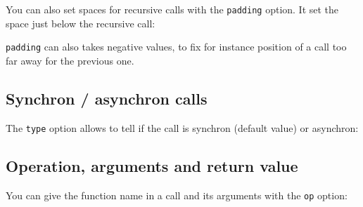 \documentclass[a4paper,11pt]{report}
\begin{document}
You can also set spaces for recursive calls with the {\tt padding} option. It set the space just below the recursive call:

\medskip

\begin{minipage}{0.5\textwidth}

\end{minipage}
\begin{minipage}{0.5\textwidth}
\begin{center}
\end{center}
\end{minipage}

\begin{remark}
{\tt padding} can also takes negative values, to fix for instance position of a call too far away for the previous one.
\end{remark}

\subsection{Synchron / asynchron calls}\label{ss.callsync}

The {\tt type} option allows to tell if the call is synchron (default value) or asynchron:

\medskip

\begin{minipage}{0.5\textwidth}

\end{minipage}
\begin{minipage}{0.5\textwidth}
\begin{center}
\end{center}
\end{minipage}

\subsection{Operation, arguments and return value}\label{ss.callop}

You can give the function name in a call and its arguments with the {\tt op} option:

\medskip

\begin{minipage}{0.5\textwidth}

\end{minipage}
\begin{minipage}{0.5\textwidth}
\begin{center}
\end{center} 
\end{minipage}
\end{document}
